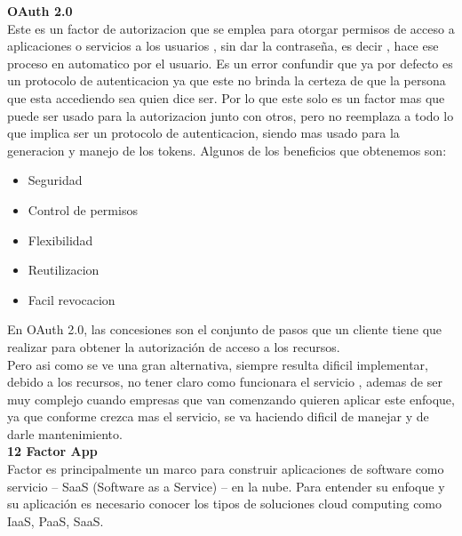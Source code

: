 \documentclass[12pt]{article}
\begin{document}
 \textbf{OAuth 2.0 } \\
Este es un factor de autorizacion que se emplea para otorgar permisos de acceso a aplicaciones o servicios a los usuarios , sin dar la contraseña, es decir , hace ese proceso en automatico por el usuario.
Es un error confundir que ya por defecto es un protocolo de autenticacion ya que este no brinda la certeza de que la persona que esta accediendo sea quien dice ser. Por lo que este solo es un factor mas que puede ser usado para la autorizacion junto con otros, pero no reemplaza a todo lo que implica ser un protocolo de autenticacion, siendo mas usado para la generacion y manejo de los tokens.
Algunos de los beneficios que obtenemos son:
\begin{itemize}
    \item Seguridad
    \item Control de permisos
    \item Flexibilidad
    \item Reutilizacion
    \item Facil revocacion
\end{itemize}
En OAuth 2.0, las concesiones son el conjunto de pasos que un cliente tiene que realizar para obtener la autorización de acceso a los recursos.
 \\ 
Pero asi como se ve una gran alternativa, siempre resulta dificil implementar, debido a los recursos, no tener claro como funcionara el servicio , ademas de ser muy complejo cuando empresas que van comenzando quieren aplicar este enfoque, ya que conforme crezca mas el servicio, se va haciendo dificil de manejar y de darle mantenimiento.
 \\

  \textbf{12 Factor App } \\
Factor es principalmente un marco para construir aplicaciones de software como servicio – SaaS (Software as a Service) – en la nube. Para entender su enfoque y su aplicación es necesario conocer los tipos de soluciones cloud computing como IaaS, PaaS, SaaS.
\end{document}
